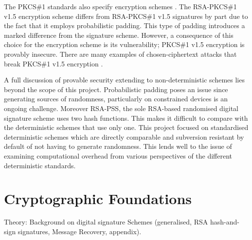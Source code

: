 \documentclass[]{final_report}
\theoremstyle{definition}
\begin{document}
The PKCS\#1 standards also specify encryption schemes \cite{rfc2313}. The RSA-PKCS\#1 v1.5 encryption scheme differs from RSA-PKCS\#1 v1.5 signatures by part due to the fact that it employs probabilistic padding. This type of padding introduces a marked difference from the signature scheme. However, a consequence of this choice for the encryption scheme is its vulnerability; PKCS\#1 v1.5 encryption is provably insecure. There are many examples of chosen-ciphertext attacks that break PKCS\#1 v1.5 encryption \cite{bleichenbacher1998chosen, coppersmith1996low, coron2000new, 10.1007/978-3-540-45238-6_33, degabriele2012joint, bardou2012efficient, meyer2014revisiting, zhang2014cross, jager2015security, jager2015practical, bock2018return}. 

A full discussion of provable security extending to non-deterministic schemes lies beyond the scope of this project. Probabilistic padding poses an issue since generating sources of randomness, particularly on constrained devices is an ongoing challenge. Moreover RSA-PSS, the sole RSA-based randomised digital signature scheme uses two hash functions. This makes it difficult to compare with the deterministic schemes that use only one. This project focused on standardised deterministic schemes which are directly comparable and subversion resistant \cite{ateniese2015subversion} by default of not having to generate randomness. This lends well to the issue of examining computational overhead from various perspectives of the different deterministic standards.



\chapter{Cryptographic Foundations}
Theory: Background on digital signature Schemes (generalised, RSA hash-and-sign signatures, Message Recovery, appendix).
\end{document}
